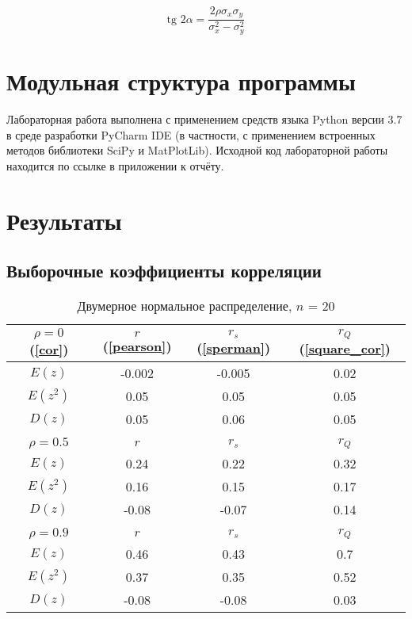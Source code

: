 \documentclass[a4paper]{article}
\begin{document}
        \begin{equation}\label{angles}
            \text{tg } 2 \alpha = \dfrac{2 \rho \sigma_x \sigma_y}{\sigma^2_x - \sigma^2_y}
        \end{equation}

\section{Модульная структура программы}

    Лабораторная работа выполнена с применением средств языка Python версии 3.7 в среде разработки PyCharm IDE (в частности, с применением встроенных методов библиотеки SciPy и MatPlotLib). Исходной код лабораторной работы находится по ссылке в приложении к отчёту.
    
\section{Результаты}

    \subsection{Выборочные коэффициенты корреляции}
    
        \begin{table}[H]
            \centering
            \begin{tabular}{|c|c|c|c|}
                \hline
                 $\rho = 0$ (\ref{cor}) & $r$ (\ref{pearson}) & $r_s$ (\ref{sperman}) & $r_Q$ (\ref{square_cor})  \\ \hline
                 $E(z)$ & -0.002 & -0.005 & 0.02  \\ \hline
                 $E(z^2)$ & 0.05 & 0.05 & 0.05  \\ \hline
                 $D(z)$ & 0.05 & 0.06 & 0.05  \\ \hline
                 & & & \\ \hline
                 $\rho = 0.5$ & $r$ & $r_s$ & $r_Q$  \\ \hline
                 $E(z)$ & 0.24 & 0.22 & 0.32  \\ \hline
                 $E(z^2)$ & 0.16 & 0.15 & 0.17  \\ \hline
                 $D(z)$ & -0.08 & -0.07 & 0.14  \\ \hline
                 & & & \\ \hline
                 $\rho = 0.9$ & $r$ & $r_s$ & $r_Q$  \\ \hline
                 $E(z)$ & 0.46 & 0.43 & 0.7  \\ \hline
                 $E(z^2)$ & 0.37 & 0.35 & 0.52  \\ \hline
                 $D(z)$ & -0.08 & -0.08 & 0.03  \\ \hline
                 
            \end{tabular}
            \caption{Двумерное нормальное распределение, $n$ = 20}
            \label{tab:normal_20}
        \end{table}
        
\end{document}
